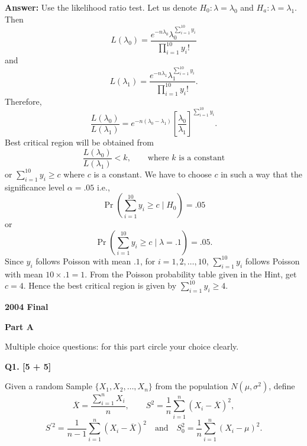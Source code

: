 \documentclass[11pt]{article}
\begin{document}
\textbf{Answer:} Use the likelihood ratio test. Let us denote $H_0:\lambda=\lambda_0$ and $H_a:\lambda=\lambda_1$. Then
\[
L(\lambda_0)=\frac{e^{-n\lambda_0}\lambda_0^{\sum_{i=1}^{10}y_i}}{\prod_{i=1}^{10}y_i!}
\]
and
\[
L(\lambda_1)=\frac{e^{-n\lambda_1}\lambda_1^{\sum_{i=1}^{10}y_i}}{\prod_{i=1}^{10}y_i!}.
\]
Therefore,
\[
\frac{L(\lambda_0)}{L(\lambda_1)}
=e^{-n(\lambda_0-\lambda_1)}\left[\frac{\lambda_0}{\lambda_1}\right]^{\sum_{i=1}^{10}y_i}.
\]
Best critical region will be obtained from
\[
\frac{L(\lambda_0)}{L(\lambda_1)}<k,
\qquad\text{where }k\text{ is a constant}
\]
or $\sum_{i=1}^{10}y_i\geq c$ where $c$ is a constant. We have to choose $c$ in such a way that the significance level $\alpha=.05$ i.e.,
\[
\Pr\left(\sum_{i=1}^{10}y_i\geq c\mid H_0\right)=.05
\]
or
\[
\Pr\left(\sum_{i=1}^{10}y_i\geq c\mid\lambda=.1\right)=.05.
\]
Since $y_i$ follows Poisson with mean $.1$, for $i=1,2,\ldots,10$, $\sum_{i=1}^{10}y_i$ follows Poisson with mean $10\times .1=1$. From the Poisson probability table given in the Hint, get $c=4$. Hence the best critical region is given by $\sum_{i=1}^{10}y_i\geq4$.


\clearpage
\enlargethispage{2\baselineskip}

\begin{center}
    {\Large\bfseries 2004 Final}
\end{center}

\vspace{1em}

\begin{center}
\textbf{Part A}
\end{center}

Multiple choice questions: for this part circle your choice clearly.

\textbf{Q1. [5 + 5]}

Given a random Sample $\{X_1,X_2,\ldots,X_n\}$ from the population $N(\mu,\sigma^2)$, define
\[
\overline{X}=\frac{\sum_{i=1}^{n}X_i}{n},
\qquad
S^2=\frac{1}{n}\sum_{i=1}^{n}(X_i-\overline{X})^2,
\]
\[
S^{\prime 2}=\frac{1}{n-1}\sum_{i=1}^{n}(X_i-\overline{X})^2
\quad\text{and}\quad
S_0^2=\frac{1}{n}\sum_{i=1}^{n}(X_i-\mu)^2.
\]
\end{document}
